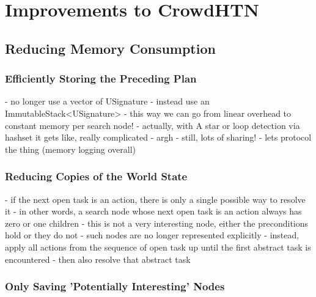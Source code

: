 \section{Improvements to CrowdHTN}

\subsection{Reducing Memory Consumption}

\subsubsection{Efficiently Storing the Preceding Plan}
- no longer use a vector of USignature
- instead use an ImmutableStack<USignature>
- this way we can go from linear overhead to constant memory per search node!
- actually, with A star or loop detection via hashset it gets like, really complicated
- argh
- still, lots of sharing!
- lets protocol the thing (memory logging overall)

\subsubsection{Reducing Copies of the World State}
- if the next open task is an action, there is only a single possible way to resolve it
- in other words, a search node whose next open task is an action always has zero or one children
- this is not a very interesting node, either the preconditions hold or they do not
- such nodes are no longer represented explicitly
- instead, apply all actions from the sequence of open task up until the first abstract task is encountered
- then also resolve that abstract task

\subsubsection{Only Saving 'Potentially Interesting' Nodes}


